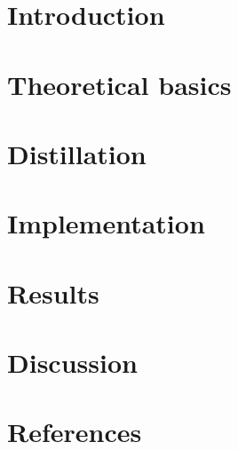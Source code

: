 \documentclass{style}
\begin{document}
    
    
    \newpage
    
    \thispagestyle{style1}
    
    \text{ }
    \newpage
    \setcounter{page}{1}
    

    \tableofcontents
    
    \newpage

    \section{Introduction}
    
    
    
    \newpage
	\section{Theoretical basics}
	
	
	
	
	
	
	
	\newpage
	
	\section{Distillation}
	
	
	
	\newpage
	\section{Implementation}\label{section:implementation}
	
	
	
	\newpage
	\section{Results}\label{section:results}
	
	
	
	\newpage
	\section{Discussion}
	
	
	
	\newpage
	\section{References}
	
	
	\newpage
	
	
\end{document}
